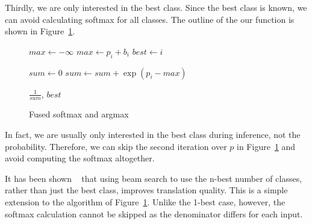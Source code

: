 \documentclass[11pt,a4paper]{article}
\begin{document}
Thirdly, we are only interested in the best class. Since the best class is known, we can avoid calculating softmax for all classes. The outline of the our function is shown in Figure~\ref{algo:Fused Kernel}.

\begin{figure} [h]
\begin{algorithmic}


\State $max \gets - \infty$ 
    \State $max \gets p_i + b_i$
    \State $best \gets i$
  \EndIf
\EndFor


\State $sum \gets 0$ 
    \State $sum \gets sum + \exp(p_i - max)$
  \EndIf
\EndFor

\Return $\frac{1}{sum}$, $best$ 

\EndProcedure
\end{algorithmic}

\caption{Fused softmax and argmax}
\label{algo:Fused Kernel}
\end{figure}

In fact, we are usually only interested in the best class during inference, not the probability. Therefore, we can skip the second iteration over $p$ in Figure~\ref{algo:Fused Kernel} and avoid computing the softmax altogether. %

% 
% 
% 
% 

It has been shown ~\citep{koehn-knowles:2017:NMT} that using beam search to use the n-best number of classes, rather than just the best class, improves translation quality. This is a simple extension to the algorithm of Figure~\ref{algo:Fused Kernel}. Unlike the 1-best case, however, the softmax calculation cannot be skipped as the denominator differs for each input.
\end{document}
